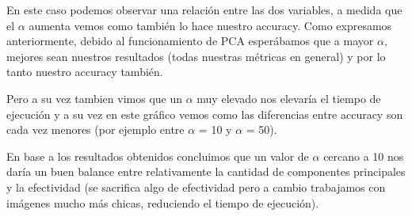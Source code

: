 En este caso podemos observar una relación entre las dos variables, a medida que el $\alpha$ aumenta vemos como también lo hace nuestro accuracy.
Como expresamos anteriormente, debido al funcionamiento de PCA esperábamos que a mayor $\alpha$, mejores sean nuestros resultados (todas nuestras métricas en general) y por lo tanto nuestro accuracy también.

Pero a su vez tambien vimos que un $\alpha$ muy elevado  nos elevaría el tiempo de ejecución y a su vez en este gráfico vemos como las diferencias entre accuracy son cada vez menores (por ejemplo entre $\alpha$ = 10 y $\alpha$ = 50).

En base a los resultados obtenidos concluimos que un valor de $\alpha$ cercano a 10 nos daría un buen balance entre relativamente la cantidad de componentes principales y la efectividad (se sacrifica algo de efectividad pero a cambio trabajamos con imágenes mucho más chicas, reduciendo el tiempo de ejecución).

